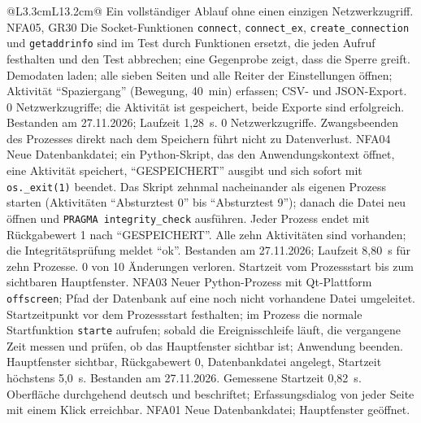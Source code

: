 \begin{longtable}{@{}L{3.3cm}L{13.2cm}@{}}
    {Ein vollständiger Ablauf ohne einen einzigen Netzwerkzugriff.}
    {NFA05, GR30}
    {}
    {Die Socket-Funktionen \texttt{connect}, \texttt{connect\_ex}, \texttt{create\_connection} und \texttt{getaddrinfo} sind im Test durch Funktionen ersetzt, die jeden Aufruf festhalten und den Test abbrechen; eine Gegenprobe zeigt, dass die Sperre greift.}
    {Demodaten laden; alle sieben Seiten und alle Reiter der Einstellungen öffnen; Aktivität \enquote{Spaziergang} (Bewegung, 40~min) erfassen; CSV- und JSON-Export.}
    {0 Netzwerkzugriffe; die Aktivität ist gespeichert, beide Exporte sind erfolgreich.}
    {Bestanden am 27.11.2026; Laufzeit 1,28~s. 0 Netzwerkzugriffe.}
  \midrule
    {Zwangsbeenden des Prozesses direkt nach dem Speichern führt nicht zu Datenverlust.}
    {NFA04}
    {}
    {Neue Datenbankdatei; ein Python-Skript, das den Anwendungskontext öffnet, eine Aktivität speichert, \enquote{GESPEICHERT} ausgibt und sich sofort mit \texttt{os.\_exit(1)} beendet.}
    {Das Skript zehnmal nacheinander als eigenen Prozess starten (Aktivitäten \enquote{Absturztest 0} bis \enquote{Absturztest 9}); danach die Datei neu öffnen und \texttt{PRAGMA integrity\_check} ausführen.}
    {Jeder Prozess endet mit Rückgabewert 1 nach \enquote{GESPEICHERT}. Alle zehn Aktivitäten sind vorhanden; die Integritätsprüfung meldet \enquote{ok}.}
    {Bestanden am 27.11.2026; Laufzeit 8,80~s für zehn Prozesse. 0 von 10 Änderungen verloren.}
  \midrule
    {Startzeit vom Prozessstart bis zum sichtbaren Hauptfenster.}
    {NFA03}
    {}
    {Neuer Python-Prozess mit Qt-Plattform \texttt{offscreen}; Pfad der Datenbank auf eine noch nicht vorhandene Datei umgeleitet.}
    {Startzeitpunkt vor dem Prozessstart festhalten; im Prozess die normale Startfunktion \texttt{starte} aufrufen; sobald die Ereignisschleife läuft, die vergangene Zeit messen und prüfen, ob das Hauptfenster sichtbar ist; Anwendung beenden.}
    {Hauptfenster sichtbar, Rückgabewert 0, Datenbankdatei angelegt, Startzeit höchstens 5,0~s.}
    {Bestanden am 27.11.2026. Gemessene Startzeit 0,82~s.}
  \midrule
    {Oberfläche durchgehend deutsch und beschriftet; Erfassungsdialog von jeder Seite mit einem Klick erreichbar.}
    {NFA01}
    {}
    {Neue Datenbankdatei; Hauptfenster geöffnet.}

\end{longtable}
